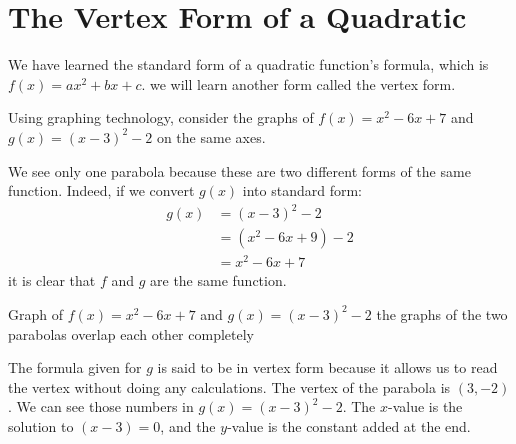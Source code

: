 \documentclass{ximera}
\begin{document}
\section{The Vertex Form of a Quadratic}

      We have learned the standard form of a quadratic function's formula, which is $f(x)=ax^2+bx+c$.
      we will learn another form called the vertex form.

      Using graphing technology, consider the graphs of $f(x)=x^2-6x+7$ and $g(x)=(x-3)^2-2$ on the same axes.

        We see only one parabola because these are two different forms of the same function.
        Indeed, if we convert $g(x)$ into standard form:
	\begin{align*}
		g(x)&=(x-3)^2-2\\
			&=(x^2-6x+9)-2\\
			&=x^2-6x+7
	\end{align*}
        it is clear that $f$ and $g$ are the same function.
 

       Graph of $f(x)=x^2-6x+7$ and $g(x)=(x-3)^2-2$
       the graphs of the two parabolas overlap each other completely

       \begin{image}
       \end{image}



      The formula given for $g$ is said to be in vertex form
      because it allows us to read the vertex without doing any calculations.
      The vertex of the parabola is $(3,-2)$.
      We can see those numbers in $g(x)=(x-3)^2-2$.
      The $x$-value is the solution to $(x-3)=0$,
      and the $y$-value is the constant
      added at the end.
\end{document}
